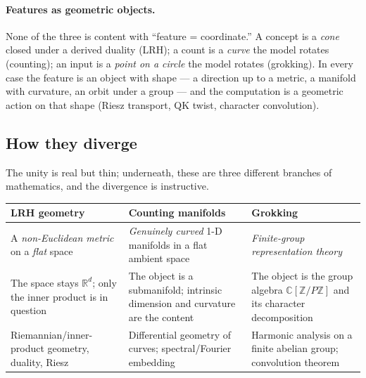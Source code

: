 \paragraph*{Features as geometric objects.}
None of the three is content with ``feature = coordinate.'' A concept is a \emph{cone} closed under a derived duality (LRH); a count is a \emph{curve} the model rotates (counting); an input is a \emph{point on a circle} the model rotates (grokking). In every case the feature is an object with shape --- a direction up to a metric, a manifold with curvature, an orbit under a group --- and the computation is a geometric action on that shape (Riesz transport, QK twist, character convolution).


\subsection*{How they diverge}

The unity is real but thin; underneath, these are three different branches of mathematics, and the divergence is instructive.

\begin{callout}
\begin{tabular}{@{}>{\raggedright\arraybackslash}p{}>{\raggedright\arraybackslash}p{}>{\raggedright\arraybackslash}p{}@{}}
\toprule
\textbf{LRH geometry} & \textbf{Counting manifolds} & \textbf{Grokking} \\
\midrule
A \emph{non-Euclidean metric} on a \emph{flat} space & \emph{Genuinely curved} 1-D manifolds in a flat ambient space & \emph{Finite-group representation theory} \\[0.4em]
The space stays $\mathbb{R}^d$; only the inner product is in question & The object is a submanifold; intrinsic dimension and curvature are the content & The object is the group algebra $\mathbb{C}[\mathbb{Z}/P\mathbb{Z}]$ and its character decomposition \\[0.4em]
Riemannian/inner-product geometry, duality, Riesz & Differential geometry of curves; spectral/Fourier embedding & Harmonic analysis on a finite abelian group; convolution theorem \\
\bottomrule
\end{tabular}
\end{callout}

